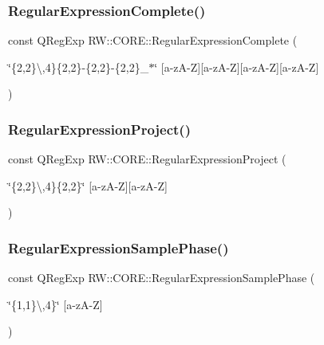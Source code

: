 \subsubsection{\texorpdfstring{Regular\+Expression\+Complete()}{RegularExpressionComplete()}}
{\footnotesize\ttfamily const Q\+Reg\+Exp R\+W\+::\+C\+O\+R\+E\+::\+Regular\+Expression\+Complete (\begin{DoxyParamCaption}\item[{\char`\"{}\{2,2\}\textbackslash{},4\}\{2,2\}-\/\{2,2\}-\/\{2,2\}\+\_\+$\ast$\char`\"{}}]{\mbox{[}a-\/z\+A-\/\+Z\mbox{]}\mbox{[}a-\/z\+A-\/\+Z\mbox{]}\mbox{[}a-\/z\+A-\/\+Z\mbox{]}\mbox{[}a-\/z\+A-\/\+Z\mbox{]} }\end{DoxyParamCaption})}

\hypertarget{namespace_r_w_1_1_c_o_r_e_ab0555e52caff872d40392a747e32cada}{}\label{namespace_r_w_1_1_c_o_r_e_ab0555e52caff872d40392a747e32cada} 
\subsubsection{\texorpdfstring{Regular\+Expression\+Project()}{RegularExpressionProject()}}
{\footnotesize\ttfamily const Q\+Reg\+Exp R\+W\+::\+C\+O\+R\+E\+::\+Regular\+Expression\+Project (\begin{DoxyParamCaption}\item[{\char`\"{}\{2,2\}\textbackslash{},4\}\{2,2\}\char`\"{}}]{\mbox{[}a-\/z\+A-\/\+Z\mbox{]}\mbox{[}a-\/z\+A-\/\+Z\mbox{]} }\end{DoxyParamCaption})}

\hypertarget{namespace_r_w_1_1_c_o_r_e_aa75ce6c9ceaa39499c64b959ab78c7ea}{}\label{namespace_r_w_1_1_c_o_r_e_aa75ce6c9ceaa39499c64b959ab78c7ea} 
\subsubsection{\texorpdfstring{Regular\+Expression\+Sample\+Phase()}{RegularExpressionSamplePhase()}}
{\footnotesize\ttfamily const Q\+Reg\+Exp R\+W\+::\+C\+O\+R\+E\+::\+Regular\+Expression\+Sample\+Phase (\begin{DoxyParamCaption}\item[{\char`\"{}\{1,1\}\textbackslash{},4\}\char`\"{}}]{\mbox{[}a-\/z\+A-\/\+Z\mbox{]} }\end{DoxyParamCaption})}



